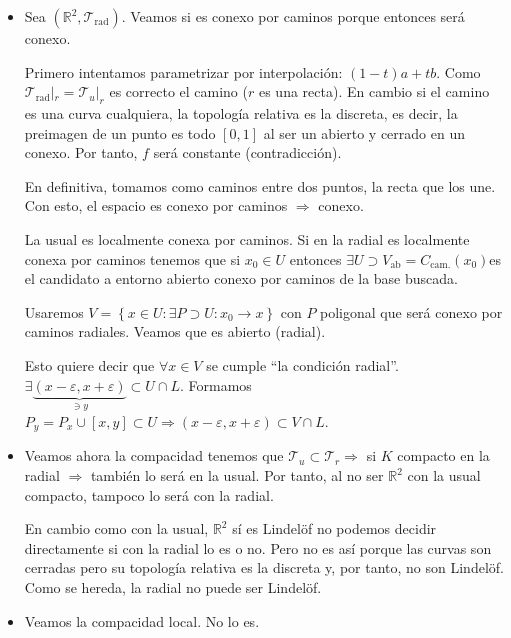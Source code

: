 \begin{ej}
\begin{itemize}
    \item Sea $\left( \mathbb{R}^2, \mathcal{T}_{\text{rad}} \right)$. Veamos si es conexo por caminos porque entonces será conexo.

    Primero intentamos parametrizar por interpolación: $\left( 1 - t \right)a + tb$. Como $\mathcal{T}_{\text{rad}}|_r = \mathcal{T}_{u}|_r$ es correcto el camino ($r$ es una recta).
    En cambio si el camino es una curva cualquiera, la topología relativa es la discreta, es decir, la preimagen de un punto es todo $\left[ 0, 1 \right]$ al ser 
    un abierto y cerrado en un conexo. Por tanto, $f$ será constante (contradicción).

    En definitiva, tomamos como caminos entre dos puntos, la recta que los une. Con esto, el espacio es conexo por caminos $\Rightarrow$ conexo.

    La usual es localmente conexa por caminos. Si en la radial es localmente conexa por caminos tenemos que si $x_0 \in U$ entonces $\exists U \supset V_{\text{ab}} = C_{\text{cam.}} \left( x_0 \right)$es el candidato a entorno abierto conexo por caminos de la base buscada. 

    Usaremos $V = \left\{ x \in U : \exists P \supset U: x_0 \rightarrow x\right\}$ con $P$ poligonal %
    que será conexo por caminos radiales. Veamos que es abierto (radial).

    Esto quiere decir que $\forall x \in V$ se cumple ``la condición radial''.
    $\exists \underbrace{\left( x - \varepsilon, x + \varepsilon \right)}_{\ni y} \subset U \cap L$. Formamos $P_y = P_x \cup \left[ x, y \right] \subset U \Rightarrow \left( x - \varepsilon, x + \varepsilon \right) \subset V \cap L$.

    \item Veamos ahora la compacidad tenemos que $\mathcal{T}_u \subset \mathcal{T}_r \Rightarrow$ si $K$ compacto en la radial $\Rightarrow$ también lo será en la usual. Por tanto, al no ser $\mathbb{R}^2$ con la usual compacto, tampoco lo será con la radial.

    En cambio como con la usual, $\mathbb{R}^2$ sí es Lindelöf no podemos decidir directamente si con la radial lo es o no. Pero no es así porque las curvas son cerradas pero su topología relativa es la 
    discreta y, por tanto, no son Lindelöf. Como se hereda, la radial no puede ser Lindelöf.

    \item Veamos la compacidad local. No lo es. %
\end{itemize}
\end{ej}
